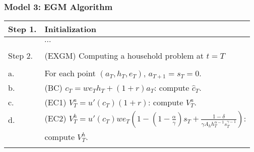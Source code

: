 \documentclass[xcolor=x11names,compress]{beamer}
\renewcommand{\(}{\begin{columns}}
\renewcommand{\)}{\end{columns}}
\newcommand{\<}[1]{\begin{column}{#1}}
\renewcommand{\>}{\end{column}}
\begin{document}
\begin{frame}
\frametitle{Model 3: EGM Algorithm}
\vspace{-0.7em}
\begin{center}
\footnotesize
\begin{tabular}{p{1cm} p{9cm}}
\hline
Step 1. & Initialization\\
\hline
\\[-0.8em]
& $\cdots$\\
\\[-0.8em]\hline
Step 2. &(EXGM) Computing a household problem at $t=T$\\
\hline
\\[-0.8em]
\hfill a.& For each point $(a_T, h_T, e_T)$, $a_{T+1}=s_T=0$.\\
\hfill b.& (BC) $c_T = w e_T h_T + (1+r) a_T$: compute $\hat{c}_T$.\\
\hfill c.& (EC1) $V^a_{T} = u'(c_T)(1+r)$: compute $V^a_T$.\\
\hfill d.& (EC2) $V^h_{T} = u'(c_T) w e_T \left(1 - \left(1-\frac{\alpha}{\gamma}\right) s_T + \frac{1-\delta}{\gamma A_h h_T^{\alpha-1} s_T^{\gamma -1}}\right)$: \\
& compute $V^h_{T}$.\\
\\[-0.5em]\hline
\end{tabular}
\end{center}
\end{frame}
\end{document}
